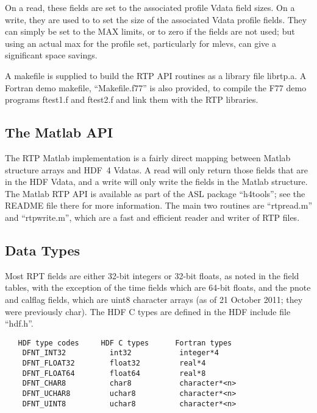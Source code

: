 \documentclass[12pt]{article}
\begin{document}
On a read, these fields are set to the associated profile Vdata
field sizes.  On a write, they are used to to set the size of the
associated Vdata profile fields.  They can simply be set to the MAX
limits, or to zero if the fields are not used; but using an actual
max for the profile set, particularly for mlevs, can give a
significant space savings.

A makefile is supplied to build the RTP API routines as a library
file librtp.a.  A Fortran demo makefile, ``Makefile.f77'' is also
provided, to compile the F77 demo programs ftest1.f and ftest2.f
and link them with the RTP libraries.


\subsection{The Matlab API}

The RTP Matlab implementation is a fairly direct mapping between
Matlab structure arrays and HDF~4 Vdatas.  A read will only return
those fields that are in the HDF Vdata, and a write will only write
the fields in the Matlab structure.  The Matlab RTP API is available
as part of the ASL package ``h4tools''; see the README file there
for more information.  The main two routines are ``rtpread.m'' and
``rtpwrite.m'', which are a fast and efficient reader and writer
of RTP files.

\subsection{Data Types}

Most RPT fields are either 32-bit integers or 32-bit floats, as
noted in the field tables, with the exception of the time fields
which are 64-bit floats, and the pnote and calflag fields, which are
uint8 character arrays (as of 21 October 2011; they were previously
char).  The HDF C types are defined in the HDF include file ``hdf.h''.

{\small
\begin{verbatim}
   HDF type codes     HDF C types      Fortran types
    DFNT_INT32          int32           integer*4
    DFNT_FLOAT32        float32         real*4
    DFNT_FLOAT64        float64         real*8
    DFNT_CHAR8          char8           character*<n>
    DFNT_UCHAR8         uchar8          character*<n>
    DFNT_UINT8          uchar8          character*<n>
\end{verbatim}
}
\end{document}
